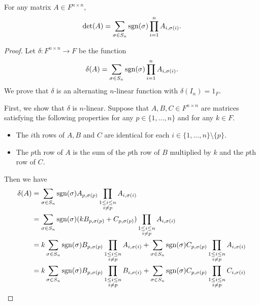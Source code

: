 \begin{theorem}
  \label{thm:determinant-permutation}
  For any matrix $A \in F^{n \times n}$,
  \begin{equation*}
    \det(A)
    = \sum_{\sigma \in S_n} \operatorname{sgn}(\sigma) \prod_{i=1}^n A_{i, \sigma(i)}.
  \end{equation*}
\end{theorem}
\begin{proof}
  Let $\delta: F^{n \times n} \to F$ be the function
  \begin{equation*}
    \delta(A)
    = \sum_{\sigma \in S_n} \operatorname{sgn}(\sigma) \prod_{i=1}^n A_{i, \sigma(i)}.
  \end{equation*}
  We prove that $\delta$ is an alternating $n$-linear function with
  $\delta(I_n) = 1_F$.

  First, we show that $\delta$ is $n$-linear.
  Suppose that $A, B, C \in F^{n \times n}$ are matrices satisfying the
  following properties for any $p \in \{1, \dots, n\}$ and for any $k \in F$.
  \begin{itemize}
    \item The $i$th rows of $A, B$ and $C$ are identical for each
    $i \in \{1, \dots, n\} \setminus \{p\}$.
    \item The $p$th row of $A$ is the sum of the $p$th row of $B$ multiplied by
    $k$ and the $p$th row of $C$.
  \end{itemize}
  Then we have
  \begin{align*}
    \delta(A)
    &= \sum_{\sigma \in S_n} \sgn(\sigma) A_{p,\sigma(p)}
    \prod_{\substack{1 \leq i \leq n \\ i \neq p}} A_{i,\sigma(i)} \\
    &= \sum_{\sigma \in S_n} \sgn(\sigma) (kB_{p,\sigma(p)} + C_{p,\sigma(p)})
    \prod_{\substack{1 \leq i \leq n \\ i \neq p}} A_{i,\sigma(i)} \\
    &= k\sum_{\sigma \in S_n} \sgn(\sigma) B_{p,\sigma(p)}
    \prod_{\substack{1 \leq i \leq n \\ i \neq p}} A_{i,\sigma(i)}
    + \sum_{\sigma \in S_n} \sgn(\sigma) C_{p,\sigma(p)}
    \prod_{\substack{1 \leq i \leq n \\ i \neq p}} A_{i,\sigma(i)} \\
    &= k\sum_{\sigma \in S_n} \sgn(\sigma) B_{p,\sigma(p)}
    \prod_{\substack{1 \leq i \leq n \\ i \neq p}} B_{i,\sigma(i)}
    + \sum_{\sigma \in S_n} \sgn(\sigma) C_{p,\sigma(p)}
    \prod_{\substack{1 \leq i \leq n \\ i \neq p}} C_{i,\sigma(i)} \\

\end{align*}
\end{proof}
